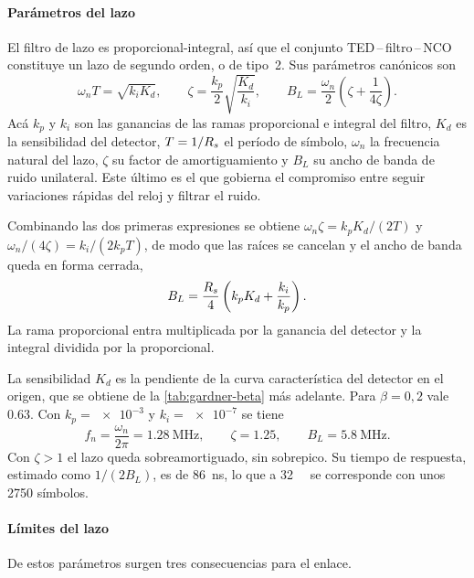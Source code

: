 \paragraph{Par\'ametros del lazo}
El filtro de lazo es proporcional-integral, as\'i que el conjunto
TED\,--\,filtro\,--\,NCO constituye un lazo de segundo orden, o de tipo~2. Sus
par\'ametros can\'onicos son~\cite[ec.~(7.10)--(7.12)]{mello2021}
\begin{equation}
  \omega_n T = \sqrt{k_i K_d},
  \qquad
  \zeta = \frac{k_p}{2}\sqrt{\frac{K_d}{k_i}},
  \qquad
  B_L = \frac{\omega_n}{2}\left(\zeta + \frac{1}{4\zeta}\right).
  \label{eq:lazo-2do}
\end{equation}
Ac\'a $k_p$ y $k_i$ son las ganancias de las ramas proporcional e integral del
filtro, $K_d$ es la sensibilidad del detector, $T = 1/R_{s}$ el per\'iodo de
s\'imbolo, $\omega_n$ la frecuencia natural del lazo, $\zeta$ su factor de
amortiguamiento y $B_L$ su ancho de banda de ruido unilateral. Este \'ultimo
es el que gobierna el compromiso entre seguir variaciones r\'apidas del reloj
y filtrar el ruido.

Combinando las dos primeras expresiones se obtiene $\omega_n\zeta = k_p K_d/(2T)$
y $\omega_n/(4\zeta) = k_i/(2 k_p T)$, de modo que las ra\'ices se cancelan y
el ancho de banda queda en forma cerrada,
\begin{equation}
  B_L = \frac{R_{s}}{4}\left( k_p K_d + \frac{k_i}{k_p} \right).
  \label{eq:BL-cerrada}
\end{equation}
La rama proporcional entra multiplicada por la ganancia del detector y la
integral dividida por la proporcional.

La sensibilidad $K_d$ es la pendiente de la curva caracter\'istica del
detector en el origen, que se obtiene de la \cref{tab:gardner-beta} m\'as
adelante. Para $\beta = 0{,}2$ vale \num{0.63}. Con $k_p = \num{e-3}$ y
$k_i = \num{e-7}$ se tiene
\begin{equation}
  f_n = \frac{\omega_n}{2\pi} = \SI{1.28}{\mega\hertz},
  \qquad
  \zeta = \num{1.25},
  \qquad
  B_L = \SI{5.8}{\mega\hertz}.
  \label{eq:lazo-reloj}
\end{equation}
Con $\zeta > 1$ el lazo queda sobreamortiguado, sin sobrepico. Su tiempo de
respuesta, estimado como $1/(2B_L)$, es de \SI{86}{\nano\second}, lo que a
\SI{32}{\giga\baud} se corresponde con unos \num{2750} s\'imbolos.

\paragraph{L\'imites del lazo}
De estos par\'ametros surgen tres consecuencias para el enlace.

